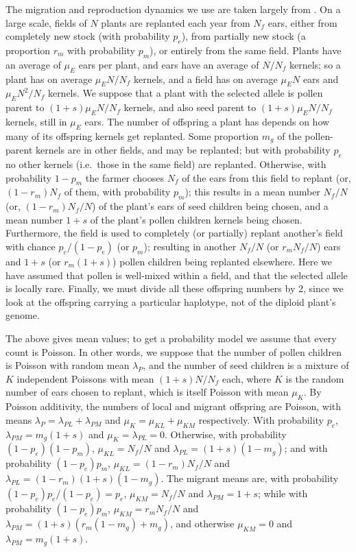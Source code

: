 The migration and reproduction dynamics we use are taken largely from \citet{vanHeerwaarden2010}.  
On a large scale,
fields of $N$ plants are replanted each year from $N_f$ ears,
either from completely new stock (with probability $p_e$),
from partially new stock (a proportion $r_m$ with probability $p_m$),
or entirely from the same field.
Plants have an average of $\mu_E$ ears per plant, and ears have an average of $N/N_f$ kernels; 
so a plant has on average $\mu_E N/N_f$ kernels, and a field has on average $\mu_E N$ ears and $\mu_E N^2/N_f$ kernels. 
We suppose that a plant with the selected allele is pollen parent to $(1+s) \mu_E N/N_f$ kernels,
and also seed parent to $(1+s)\mu_E N/N_f$ kernels, still in $\mu_E$ ears.
The number of offspring a plant has depends on how many of its offspring kernels get replanted.
Some proportion $m_g$ of the pollen-parent kernels are in other fields, and may be replanted;
but with probability $p_e$ no other kernels (i.e.~those in the same field) are replanted.
Otherwise, with probability $1-p_m$ the farmer chooses $N_f$ of the ears from this field to replant
(or, $(1-r_m) N_f$ of them, with probability $p_m$);
this results in a mean number $N_f/N$ (or, $(1-r_m)N_f/N$) of the plant's ears of seed children being chosen,
and a mean number $1+s$ of the plant's pollen children kernels being chosen.
Furthermore, the field is used to completely (or partially) replant another's field with chance $p_e/(1-p_e)$ (or $p_m$);
resulting in another $N_f/N$ (or $r_m N_f/N$) ears and $1+s$ (or $r_m (1+s)$) pollen children being replanted elsewhere.
Here we have assumed that pollen is well-mixed within a field,
and that the selected allele is locally rare.
Finally, we must divide all these offspring numbers by 2,
since we look at the offspring carrying a particular haplotype, not of the diploid plant's genome.

The above gives mean values; to get a probability model we assume that every count is Poisson.
In other words, we suppose that the number of pollen children is Poisson with random mean $\lambda_P$,
and the number of seed children is a mixture of $K$ independent Poissons with mean $(1+s)N/N_f$ each,
where $K$ is the random number of ears chosen to replant, which is itself Poisson with mean $\mu_K$.
By Poisson additivity, the numbers of local and migrant offspring are Poisson,
with means $\lambda_P = \lambda_{PL} + \lambda_{PM}$ and $\mu_K = \mu_{KL} + \mu_{KM}$ respectively.
With probability $p_e$, $\lambda_{PM} = m_g(1+s)$ and $\mu_K = \lambda_{PL} = 0$.
Otherwise, with probability $(1-p_e)(1-p_m)$, $\mu_{KL} = N_f/N$ and $\lambda_{PL} = (1+s)(1-m_g)$;
and with probability $(1-p_e)p_m$, $\mu_{KL} = (1-r_m) N_f/N$ and $\lambda_{PL} = (1-r_m)(1+s)(1-m_g)$.
The migrant means are,
with probability $(1-p_e) p_e/(1-p_e) = p_e$, $\mu_{KM} = N_f/N$ and $\lambda_{PM} = 1+s$;
while with probability $(1-p_e) p_m$, $\mu_{KM} = r_m N_f/N$ and $\lambda_{PM} = (1+s)(r_m(1-m_g) + m_g)$,
and otherwise $\mu_{KM} = 0$ and $\lambda_{PM} = m_g(1+s)$.


